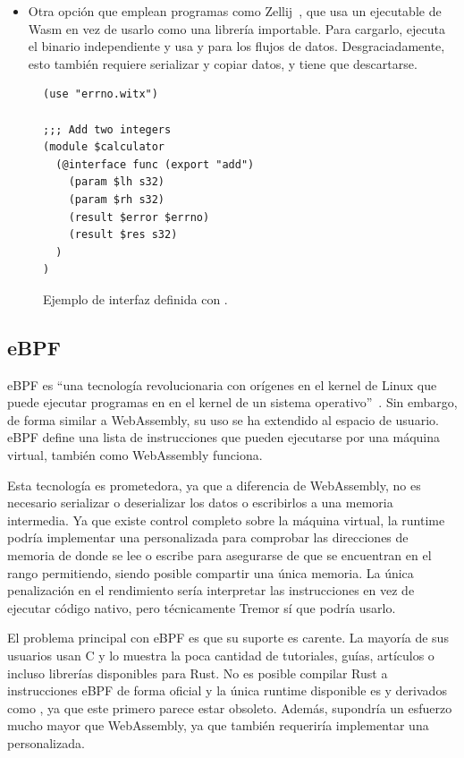 \begin{itemize}
    \item Otra opción que emplean programas como
        Zellij~\cite{zellijpluginsystem}, que usa un ejecutable de Wasm en vez
        de usarlo como una librería importable. Para cargarlo, ejecuta el
        binario independiente y usa \stdin y \stdout para los flujos de datos.
        Desgraciadamente, esto también requiere serializar y copiar datos, y
        tiene que descartarse.

\end{itemize}

\begin{figure}
    \centering
    \begin{verbatim}
(use "errno.witx")

;;; Add two integers
(module $calculator
  (@interface func (export "add")
    (param $lh s32)
    (param $rh s32)
    (result $error $errno)
    (result $res s32)
  )
)
    \end{verbatim}
    \caption{Ejemplo de interfaz definida con .}%
    \label{fig:witx_example}
\end{figure}

\subsection{eBPF}

eBPF es ``una tecnología revolucionaria con orígenes en el kernel de Linux que
puede ejecutar programas en \sandbox en el kernel de un sistema
operativo''~\cite{ebpf}. Sin embargo, de forma similar a WebAssembly, su uso se
ha extendido al espacio de usuario. eBPF define una lista de instrucciones que
pueden ejecutarse por una máquina virtual, también como WebAssembly funciona.

Esta tecnología es prometedora, ya que a diferencia de WebAssembly, no es
necesario serializar o deserializar los datos o escribirlos a una memoria
intermedia. Ya que existe control completo sobre la máquina virtual, la runtime
podría implementar una \sandbox personalizada para comprobar las direcciones de
memoria de donde se lee o escribe para asegurarse de que se encuentran en el
rango permitiendo, siendo posible compartir una única memoria. La única
penalización en el rendimiento sería interpretar las instrucciones en vez de
ejecutar código nativo, pero técnicamente Tremor sí que podría usarlo.

El problema principal con eBPF es que su suporte es carente. La mayoría de sus
usuarios usan C y lo muestra la poca cantidad de tutoriales, guías, artículos o
incluso librerías disponibles para Rust. No es posible compilar Rust a
instrucciones eBPF de forma oficial y la única runtime disponible es
 y derivados como , ya que este primero
parece estar obsoleto. Además, supondría un esfuerzo mucho mayor que
WebAssembly, ya que también requeriría implementar una \sandbox personalizada.

